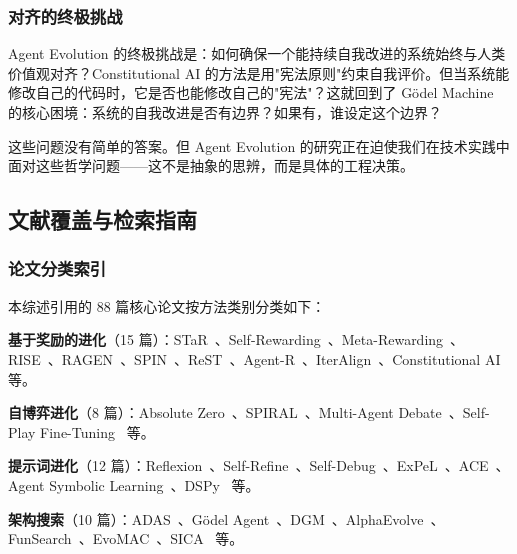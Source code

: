\subsubsection{对齐的终极挑战}

Agent Evolution 的终极挑战是：如何确保一个能持续自我改进的系统始终与人类价值观对齐？Constitutional AI 的方法是用"宪法原则"约束自我评价。但当系统能修改自己的代码时，它是否也能修改自己的"宪法"？这就回到了 Gödel Machine 的核心困境：系统的自我改进是否有边界？如果有，谁设定这个边界？

这些问题没有简单的答案。但 Agent Evolution 的研究正在迫使我们在技术实践中面对这些哲学问题——这不是抽象的思辨，而是具体的工程决策。

\subsection{文献覆盖与检索指南}\label{sec:intro-literature}

\subsubsection{论文分类索引}

本综述引用的 88 篇核心论文按方法类别分类如下：

\textbf{基于奖励的进化}（15 篇）：STaR~\citep{star2022}、Self-Rewarding~\citep{selfrewarding2024}、Meta-Rewarding~\citep{metarewarding2024}、RISE~\citep{rise2024}、RAGEN~\citep{ragen2025}、SPIN~\citep{spin2024}、ReST~\citep{rest2023}、Agent-R~\citep{agentr2024}、IterAlign~\citep{iteralign2024}、Constitutional AI~\citep{constitutionalai2022} 等。

\textbf{自博弈进化}（8 篇）：Absolute Zero~\citep{absolutezero2025}、SPIRAL~\citep{spiral2024}、Multi-Agent Debate~\citep{madd2023}、Self-Play Fine-Tuning~\citep{spin2024} 等。

\textbf{提示词进化}（12 篇）：Reflexion~\citep{reflexion2023}、Self-Refine~\citep{selfrefine2023}、Self-Debug~\citep{selfdebug2023}、ExPeL~\citep{expel2023}、ACE~\citep{ace2024}、Agent Symbolic Learning~\citep{agentsymboliclearning2024}、DSPy~\citep{khattab2023dspy} 等。

\textbf{架构搜索}（10 篇）：ADAS~\citep{adas2025}、Gödel Agent~\citep{godelagent2024}、DGM~\citep{darwingodelmachine2025}、AlphaEvolve~\citep{alphaevolve2025}、FunSearch~\citep{funsearch2024}、EvoMAC~\citep{evomac2024}、SICA~\citep{sica2025} 等。

